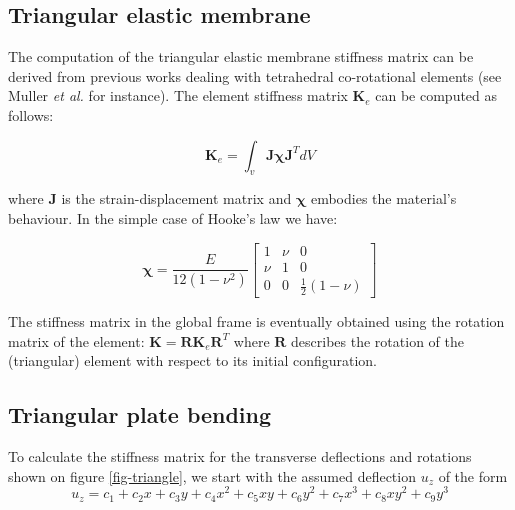 \documentclass{llncs}
\begin{document}
\subsection{Triangular elastic membrane}

The computation of the triangular elastic membrane stiffness matrix can be derived from previous works dealing with tetrahedral co-rotational elements (see Muller \emph{et al.} \cite{Muller04} for instance). The element stiffness matrix $\textbf{K}_e$ can be computed as follows:

\begin{equation}
\textbf{K}_e = \int_v \textbf{J} \boldsymbol\chi \textbf{J}^{T} dV
\end{equation}

where $\textbf{J}$ is the strain-displacement matrix and $\boldsymbol\chi$ embodies the material's behaviour. In the simple case of Hooke's law we have:

\begin{equation}
\boldsymbol\chi = \frac{E}{12(1-\nu^2)}
\begin{bmatrix}
1 & \nu & 0 \\
\nu & 1 & 0 \\
0 & 0 & \frac{1}{2} (1-\nu)
\end{bmatrix}
\end{equation}

The stiffness matrix in the global frame is eventually obtained using the rotation matrix of the element: $\textbf{K} = \textbf{R} \textbf{K}_e \textbf{R}^{T}$ where $\textbf{R}$ describes the rotation of the (triangular) element with respect to its initial configuration.

\subsection{Triangular plate bending}

To calculate the stiffness matrix for the transverse deflections and rotations shown on figure \ref{fig-triangle}, we start with the assumed deflection $u_z$ of the form
\begin{equation}
 u_z = c_1 + c_2x + c_3y + c_4x^2 + c_5xy + c_6y^2 + c_7x^3 + c_8xy^2 + c_9y^3
\label{eq-deflection}
\end{equation} 
\end{document}
